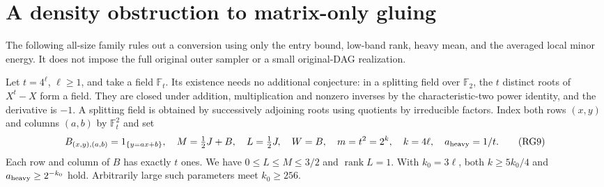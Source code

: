 \documentclass[11pt]{article}
\begin{document}
\section{A density obstruction to matrix-only gluing}
The following all-size family rules out a conversion using only
the entry bound, low-band rank, heavy mean, and the averaged local
minor energy. It does not impose the full original outer sampler
or a small original-DAG realization.

Let $t=4^\ell$, $\ell\ge1$, and take a field $\mathbb F_t$.
Its existence needs no additional conjecture: in a splitting field
over $\mathbb F_2$, the $t$ distinct roots of $X^t-X$ form a field.
They are closed under addition, multiplication and nonzero inverses
by the characteristic-two power identity, and the derivative is $-1$.
A splitting field is obtained by successively adjoining roots using
quotients by irreducible factors.
Index both rows $(x,y)$ and columns $(a,b)$ by $\mathbb F_t^2$ and set
\[
 B_{(x,y),(a,b)}=1_{\{y=ax+b\}},\quad
 M=\tfrac12J+B,\quad L=\tfrac12J,\quad W=B,\quad
 m=t^2=2^k,\quad k=4\ell,\quad a_{\rm heavy}=1/t.        \tag{RG9}
\]
Each row and column of $B$ has exactly $t$ ones.
We have $0\le L\le M\le3/2$ and $\operatorname{rank}L=1$.
With $k_0=3\ell$, both $k\ge5k_0/4$ and
$a_{\rm heavy}\ge2^{-k_0}$ hold. Arbitrarily large such parameters
meet $k_0\ge256$.
\end{document}
